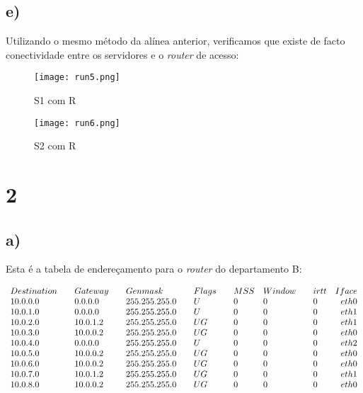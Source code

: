 \documentclass{llncs}
\begin{document}
\newpage

\subsection*{e)}
Utilizando o mesmo método da alínea anterior, verificamos que existe de facto conectividade entre os servidores e o \textit{router} de acesso:

\begin{figure}[!ht]
    \centering
    \begin{minipage}{0.40\textwidth}
        \centering
        \texttt{[image: run5.png]} %
        \caption{S1 com R}
    \end{minipage}\hfill
    \begin{minipage}{0.40\textwidth}
        \centering
        \texttt{[image: run6.png]} %
        \caption{S2 com R}
    \end{minipage}
\end{figure}

\section*{2}

\subsection*{a)}

Esta é a tabela de endereçamento para o \textit{router} do departamento B:

\[
    \begin{array}{l l l l l l l l l l l l r}
Destination  &&  Gateway    &&    Genmask       && Flags && MSS&Window &&irtt&Iface\\
10.0.0.0     &&  0.0.0.0    &&    255.255.255.0 && U     &&   0&0      &&   0&eth0\\
10.0.1.0     &&  0.0.0.0    &&    255.255.255.0 && U     &&   0&0      &&   0&eth1\\
10.0.2.0     &&  10.0.1.2   &&    255.255.255.0 && UG    &&   0&0      &&   0&eth1\\
10.0.3.0     &&  10.0.0.2   &&    255.255.255.0 && UG    &&   0&0      &&   0&eth0\\
10.0.4.0     &&  0.0.0.0    &&    255.255.255.0 && U     &&   0&0      &&   0&eth2\\
10.0.5.0     &&  10.0.0.2   &&    255.255.255.0 && UG    &&   0&0      &&   0&eth0\\
10.0.6.0     &&  10.0.0.2   &&    255.255.255.0 && UG    &&   0&0      &&   0&eth0\\
10.0.7.0     &&  10.0.1.2   &&    255.255.255.0 && UG    &&   0&0      &&   0&eth1\\
10.0.8.0     &&  10.0.0.2   &&    255.255.255.0 && UG    &&   0&0      &&   0&eth0\\
\end{array}
\]
\end{document}
